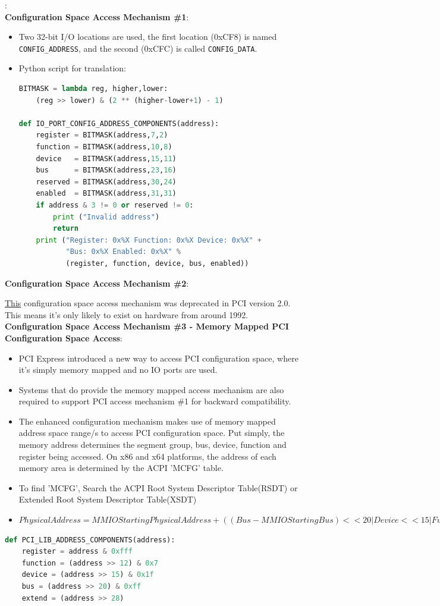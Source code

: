 \begin{note}:\\
\textbf{Configuration Space Access Mechanism \#1}:
\begin{itemize}
	\item Two 32-bit I/O locations are used, the first location (0xCF8) is named \verb|CONFIG_ADDRESS|, and the second (0xCFC) is called \verb|CONFIG_DATA|. 
	
	\item Python script for translation:
\begin{lstlisting}[language=Python]
BITMASK = lambda reg, higher,lower:
	(reg >> lower) & (2 ** (higher-lower+1) - 1)

def IO_PORT_CONFIG_ADDRESS_COMPONENTS(address):
	register = BITMASK(address,7,2)
	function = BITMASK(address,10,8)
	device   = BITMASK(address,15,11)
	bus      = BITMASK(address,23,16)
	reserved = BITMASK(address,30,24)
	enabled  = BITMASK(address,31,31)
	if address & 3 != 0 or reserved != 0:
		print ("Invalid address")
		return
	print ("Register: 0x%X Function: 0x%X Device: 0x%X" +
	       "Bus: 0x%X Enabled: 0x%X" % 
	       (register, function, device, bus, enabled))
\end{lstlisting}
\end{itemize}
\textbf{Configuration Space Access Mechanism \#2}:

\href{https://wiki.osdev.org/PCI#Configuration_Space_Access_Mechanism_.232}{This} configuration space access mechanism was deprecated in PCI version 2.0. This means it's only likely to exist on hardware from around 1992.\\
\textbf{Configuration Space Access Mechanism \#3 - Memory Mapped PCI Configuration Space Access}:
\begin{itemize}
	\item PCI Express introduced a new way to access PCI configuration space, where it's simply memory mapped and no IO ports are used.
	\item Systems that do provide the memory mapped access mechanism are also required to support PCI access mechanism \#1 for backward compatibility.
	\item The enhanced configuration mechanism makes use of memory mapped address space range/s to access PCI configuration space. Put simply, the memory address determines the segment group, bus, device, function and register being accessed. On x86 and x64 platforms, the address of each memory area is determined by the ACPI 'MCFG' table.
	\item To find 'MCFG', Search the ACPI Root System Descriptor Table(RSDT) or Extended Root System Descriptor Table(XSDT)
	\item $Physical Address = MMIO Starting Physical Address + ( (Bus - MMIO Starting Bus) << 20 | Device << 15 | Function << 12 )$
\end{itemize}

\begin{lstlisting}[language=Python]
def PCI_LIB_ADDRESS_COMPONENTS(address):
	register = address & 0xfff
	function = (address >> 12) & 0x7
	device = (address >> 15) & 0x1f
	bus = (address >> 20) & 0xff
	extend = (address >> 28)
	

\end{lstlisting}
\end{note}
